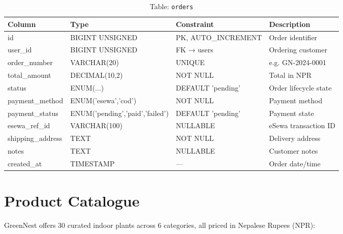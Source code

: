 \documentclass[12pt,a4paper]{report}
\begin{document}
\begin{table}[H]
\centering
\caption{Table: \texttt{orders}}
\begin{tabular}{@{}llll@{}}
\toprule
\textbf{Column}    & \textbf{Type}     & \textbf{Constraint}     & \textbf{Description} \\
\midrule
id                 & BIGINT UNSIGNED   & PK, AUTO\_INCREMENT     & Order identifier \\
user\_id           & BIGINT UNSIGNED   & FK → users              & Ordering customer \\
order\_number      & VARCHAR(20)       & UNIQUE                  & e.g. GN-2024-0001 \\
total\_amount      & DECIMAL(10,2)     & NOT NULL                & Total in NPR \\
status             & ENUM(...)         & DEFAULT 'pending'       & Order lifecycle state \\
payment\_method    & ENUM('esewa','cod')& NOT NULL               & Payment method \\
payment\_status    & ENUM('pending','paid','failed') & DEFAULT 'pending' & Payment state \\
esewa\_ref\_id     & VARCHAR(100)      & NULLABLE                & eSewa transaction ID \\
shipping\_address  & TEXT              & NOT NULL                & Delivery address \\
notes              & TEXT              & NULLABLE                & Customer notes \\
created\_at        & TIMESTAMP         & —                       & Order date/time \\
\bottomrule
\end{tabular}
\end{table}

\section{Product Catalogue}

GreenNest offers 30 curated indoor plants across 6 categories, all priced in Nepalese Rupees (NPR):
\end{document}
